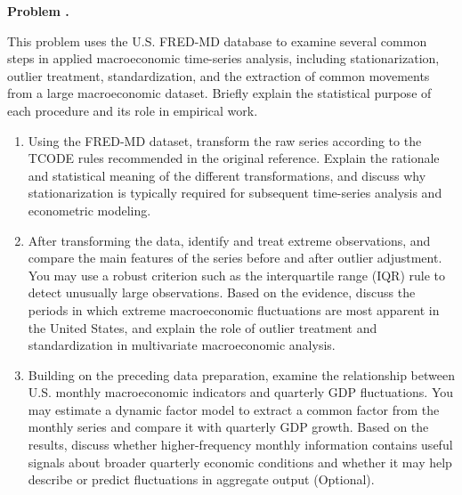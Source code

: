 \documentclass[11pt]{article}
\newcounter{problem}
\newenvironment{problem}[1][]{
	\refstepcounter{problem}
	\vspace{0.75em}
	\noindent\textbf{Problem \theproblem.} \textit{#1}\par
	\vspace{0.25em}
}{\vspace{0.5em}}
\begin{document}
	\begin{problem}
		This problem uses the U.S. FRED-MD database to examine several common steps in applied macroeconomic time-series analysis, including stationarization, outlier treatment, standardization, and the extraction of common movements from a large macroeconomic dataset. Briefly explain the statistical purpose of each procedure and its role in empirical work.
		
		\begin{enumerate}[label=(\alph*)]
			\item Using the FRED-MD dataset, transform the raw series according to the TCODE rules recommended in the original reference. Explain the rationale and statistical meaning of the different transformations, and discuss why stationarization is typically required for subsequent time-series analysis and econometric modeling.
			
			\item After transforming the data, identify and treat extreme observations, and compare the main features of the series before and after outlier adjustment. You may use a robust criterion such as the interquartile range (IQR) rule to detect unusually large observations. Based on the evidence, discuss the periods in which extreme macroeconomic fluctuations are most apparent in the United States, and explain the role of outlier treatment and standardization in multivariate macroeconomic analysis.
			
			\item Building on the preceding data preparation, examine the relationship between U.S. monthly macroeconomic indicators and quarterly GDP fluctuations. You may estimate a dynamic factor model to extract a common factor from the monthly series and compare it with quarterly GDP growth. Based on the results, discuss whether higher-frequency monthly information contains useful signals about broader quarterly economic conditions and whether it may help describe or predict fluctuations in aggregate output (Optional).
		\end{enumerate}
	\end{problem}
	
\end{document}
